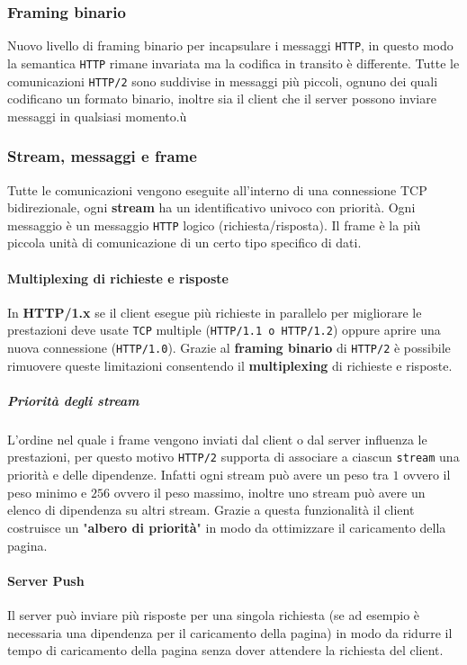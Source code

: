         \subsubsection{Framing binario}
            Nuovo livello di framing binario per incapsulare i messaggi \texttt{HTTP}, in questo modo la semantica \texttt{HTTP} rimane invariata ma la codifica in transito è differente. Tutte le comunicazioni \texttt{HTTP/2} sono suddivise in messaggi più piccoli, ognuno dei quali codificano un formato binario, inoltre sia il client che il server possono inviare messaggi in qualsiasi momento.ù
        \subsubsection{Stream, messaggi e frame}
            Tutte le comunicazioni vengono eseguite all'interno di una connessione TCP bidirezionale, ogni \textbf{stream} ha un identificativo univoco con priorità. Ogni messaggio è un messaggio \texttt{HTTP} logico (richiesta/risposta). Il frame è la più piccola unità di comunicazione di un certo tipo specifico di dati.
            \paragraph{Multiplexing di richieste e risposte}
                In \textbf{HTTP/1.x} se il client esegue più richieste in parallelo per migliorare le prestazioni deve usate \texttt{TCP} multiple (\texttt{HTTP/1.1 o HTTP/1.2}) oppure aprire una nuova connessione (\texttt{HTTP/1.0}). Grazie al \textbf{framing binario} di \texttt{HTTP/2} è possibile rimuovere queste limitazioni consentendo il \textbf{multiplexing} di richieste e risposte.
                \subparagraph{Priorità degli stream }L'ordine nel quale i frame vengono inviati dal client o dal server influenza le prestazioni, per questo motivo \texttt{HTTP/2} supporta di associare a ciascun \texttt{stream} una priorità e delle dipendenze. Infatti ogni stream può avere un peso tra $ 1 $ ovvero il peso minimo e $ 256 $ ovvero il peso massimo, inoltre uno stream può avere un elenco di dipendenza su altri stream. Grazie a questa funzionalità il client costruisce un "\textbf{albero di priorità}" in modo da ottimizzare il caricamento della pagina.
            \paragraph{Server Push} Il server può inviare più risposte per una singola richiesta (se ad esempio è necessaria una dipendenza per il caricamento della pagina) in modo da ridurre il tempo di caricamento della pagina senza dover attendere la richiesta del client.
